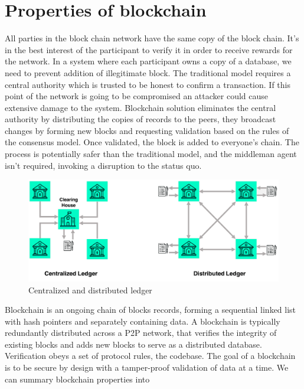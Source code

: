\section{Properties of blockchain}

All parties in the block chain network have the same copy of the block chain. It's in the best interest of the participant to verify it in order to receive rewards for the network. In a system where each participant owns a copy of a database, we need to prevent addition of illegitimate block. The traditional model requires a central authority which is trusted to be honest to confirm a transaction. If this point of the network is going to be compromised an attacker could cause extensive damage to the system. Blockchain solution eliminates the central authority by distributing the copies of records to the peers, they broadcast changes by forming new blocks and requesting validation based on the rules of the consensus model.  Once validated, the block is added to everyone’s chain. The process is potentially safer than the traditional model, and the middleman agent isn't required, invoking a disruption to the status quo.

\begin{figure}[H]
    \begin{center}
        \begin{minipage}{\linewidth}
            \begin{center}
                \includegraphics[width=\textwidth,keepaspectratio]{img/centralized_vs_distributed.png}
                \caption{Centralized and distributed ledger \cite{tradeix}}
                \label{obr 1.2.1}
            \end{center}
        \end{minipage}
    \end{center}
\end{figure}

Blockchain is an ongoing chain of blocks records, forming a sequential linked list with hash pointers and separately containing data. A blockchain is typically redundantly distributed across a P2P network, that verifies the integrity of existing blocks and adds new blocks to serve as a distributed database. Verification obeys a set of protocol rules, the codebase. The goal of a blockchain is to be secure by design with a tamper-proof validation of data at a time. We can summary blockchain properties into \cite{Conceptualizing}

